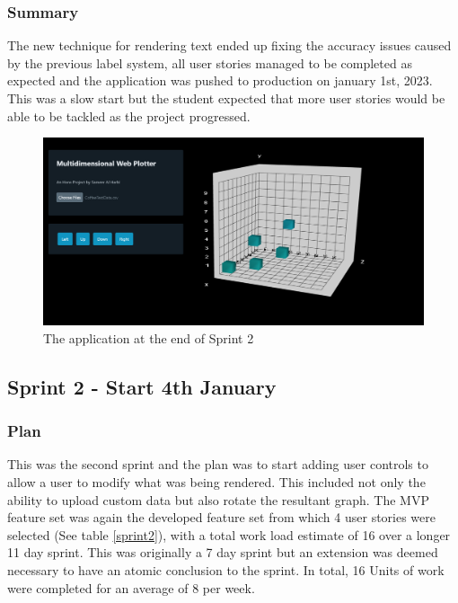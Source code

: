 \subsubsection{Summary}
The new technique for rendering text ended up fixing the accuracy issues caused by the previous label system, all user stories managed to be completed as expected and the application was pushed to production on january 1st, 2023. This was a slow start but the student expected that more user stories would be able to be tackled as the project progressed.

\begin{figure}[h]
    \centering
    \includegraphics[width=1\textwidth]{author-files/figures/Pretest1progress.png}
    \caption{The application at the end of Sprint 2}
    \label{fig:sprint2end}
\end{figure}

\subsection{Sprint 2 - Start 4th January}
\subsubsection{Plan}
This was the second sprint and the plan was to start adding user controls to allow a user to modify what was being rendered. This included not only the ability to upload custom data but also rotate the resultant graph. The MVP feature set was again the developed feature set from which 4 user stories were selected (See table \ref{sprint2}), with a total work load estimate of 16 over a longer 11 day sprint. This was originally a 7 day sprint but an extension was deemed necessary to have an atomic conclusion to the sprint. In total, 16 Units of work were completed for an average of 8 per week.

